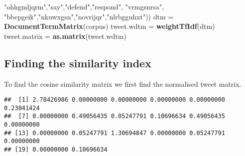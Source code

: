 \documentclass[]{article}
\newenvironment{Shaded}{\begin{snugshade}}{\end{snugshade}}
\newcommand{\KeywordTok}[1]{\textcolor[rgb]{0.13,0.29,0.53}{\textbf{#1}}}
\newcommand{\DecValTok}[1]{\textcolor[rgb]{0.00,0.00,0.81}{#1}}
\newcommand{\StringTok}[1]{\textcolor[rgb]{0.31,0.60,0.02}{#1}}
\newcommand{\CommentTok}[1]{\textcolor[rgb]{0.56,0.35,0.01}{\textit{#1}}}
\newcommand{\OperatorTok}[1]{\textcolor[rgb]{0.81,0.36,0.00}{\textbf{#1}}}
\newcommand{\NormalTok}[1]{#1}
\begin{document}
\begin{Shaded}
\begin{Highlighting}[]
                                      \StringTok{"ohhgmljqrm"}\NormalTok{,}\StringTok{"say"}\NormalTok{,}\StringTok{"defend"}\NormalTok{,}\StringTok{"respond"}\NormalTok{, }\StringTok{"vrmgsnrsa"}\NormalTok{,}
                                      \StringTok{"bbepgeik"}\NormalTok{,}\StringTok{"nkuwxgsn"}\NormalTok{,}\StringTok{"novrijqr"}\NormalTok{,}\StringTok{"nlrbgguhxt"}\NormalTok{))}
\NormalTok{dtm =}\StringTok{ }\KeywordTok{DocumentTermMatrix}\NormalTok{(corpus)}
\NormalTok{tweet.wdtm =}\StringTok{ }\KeywordTok{weightTfIdf}\NormalTok{(dtm)}
\NormalTok{tweet.matrix =}\StringTok{ }\KeywordTok{as.matrix}\NormalTok{(tweet.wdtm)}
\end{Highlighting}
\end{Shaded}

\subsection{Finding the similarity
index}\label{finding-the-similarity-index}

To find the cosine similarity matrix we first find the normalised tweet
matrix.

\begin{Shaded}
\end{Shaded}

\begin{verbatim}
##  [1] 2.78426986 0.00000000 0.00000000 0.00000000 0.00000000 0.23041424
##  [7] 0.00000000 0.49056435 0.05247791 0.10696634 0.49056435 0.00000000
## [13] 0.00000000 0.05247791 1.30694847 0.00000000 0.05247791 0.00000000
## [19] 0.00000000 0.10696634
\end{verbatim}
\end{document}
